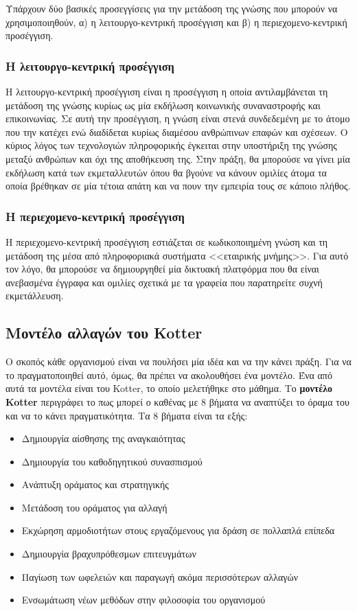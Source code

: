 Υπάρχουν δύο βασικές προσεγγίσεις για την μετάδοση της γνώσης που μπορούν να χρησιμοποιηθούν, α) η λειτουργο-κεντρική προσέγγιση και β) η περιεχομενο-κεντρική προσέγγιση.

\subsubsection*{Η λειτουργο-κεντρική προσέγγιση}

Η λειτουργο-κεντρική προσέγγιση είναι η προσέγγιση η οποία αντιλαμβάνεται τη μετάδοση της γνώσης κυρίως ως μία εκδήλωση κοινωνικής συναναστροφής και επικοινωνίας. Σε αυτή την προσέγγιση, η γνώση είναι στενά συνδεδεμένη με το άτομο που την κατέχει ενώ διαδίδεται κυρίως διαμέσου ανθρώπινων επαφών και σχέσεων. Ο κύριος λόγος των τεχνολογιών πληροφορικής έγκειται στην υποστήριξη της γνώσης μεταξύ ανθρώπων και όχι της αποθήκευση της. Στην πράξη, θα μπορούσε να γίνει μία εκδήλωση κατά των εκμεταλλευτών όπου θα βγούνε να κάνουν ομιλίες άτομα τα οποία βρέθηκαν σε μία τέτοια απάτη και να πουν την εμπειρία τους σε κάποιο πλήθος.

\subsubsection*{Η περιεχομενο-κεντρική προσέγγιση}

Η περιεχομενο-κεντρική προσέγγιση εστιάζεται σε κωδικοποιημένη γνώση και τη μετάδοση της μέσα από πληροφοριακά συστήματα <<εταιρικής μνήμης>>. Για αυτό τον λόγο, θα μπορούσε να δημιουργηθεί μία δικτυακή πλατφόρμα που θα είναι ανεβασμένα έγγραφα και ομιλίες σχετικά με τα γραφεία που παρατηρείτε συχνή εκμετάλλευση.

\subsection{Μοντέλο αλλαγών του Kotter}

Ο σκοπός κάθε οργανισμού είναι να πουλήσει μία ιδέα και να την κάνει πράξη. Για να το πραγματοποιηθεί αυτό, όμως, θα πρέπει να ακολουθήσει ένα μοντέλο. Ένα από αυτά τα μοντέλα είναι του Kotter, το οποίο μελετήθηκε στο μάθημα. Το \textbf{μοντέλο Kotter} περιγράφει το πως μπορεί ο καθένας με 8 βήματα να αναπτύξει το όραμα του και να το κάνει πραγματικότητα. Τα 8 βήματα είναι τα εξής:

\begin{itemize}
  \item Δημιουργία αίσθησης της αναγκαιότητας
  \item Δημιουργία του καθοδηγητικού συνασπισμού
  \item Ανάπτυξη οράματος και στρατηγικής
  \item Μετάδοση του οράματος για αλλαγή
  \item Εκχώρηση αρμοδιοτήτων στους εργαζόμενους για δράση σε πολλαπλά επίπεδα
  \item Δημιουργία βραχυπρόθεσμων επιτευγμάτων
  \item Παγίωση των ωφελειών και παραγωγή ακόμα περισσότερων αλλαγών
  \item Ενσωμάτωση νέων μεθόδων στην φιλοσοφία του οργανισμού
\end{itemize}

